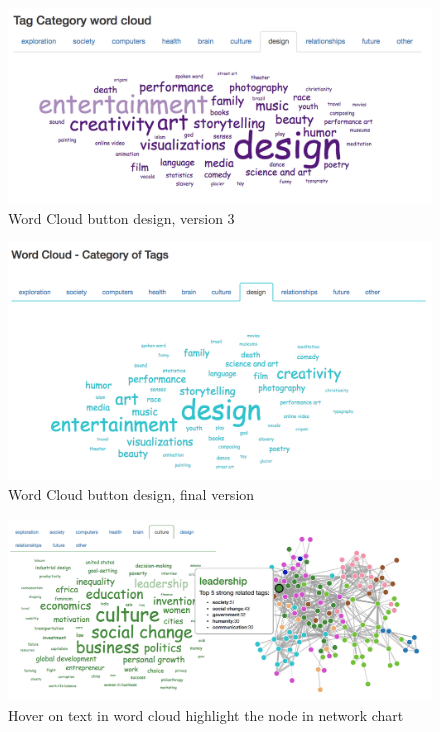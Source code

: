 \documentclass{report}
\numberwithin{figure}{section}
\begin{document}
\begin{figure}
\begin{center}
\includegraphics[scale=0.5]{wcbutton3}
\caption{Word Cloud button design, version 3}
\label{fig:wcbutton3}
\end{center}
\end{figure}

\begin{figure}
\begin{center}
\includegraphics[scale=0.5]{wcbutton4}
\caption{Word Cloud button design, final version}
\label{fig:wcbutton4}
\end{center}
\end{figure}

\begin{figure}
\begin{center}
\includegraphics[scale=0.4]{wcHover}
\caption{Hover on text in word cloud highlight the node in network chart}
\label{fig:wchover}
\end{center}
\end{figure}
\end{document}
